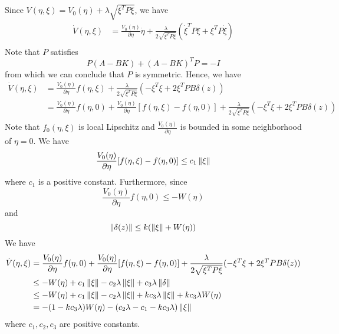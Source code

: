 \documentclass[a4 paper, 12pt]{article}
\begin{document}
Since $V(\eta,\xi) = V_0(\eta) + \lambda\sqrt{\xi^TP\xi}$, we have
\begin{equation}
        \begin{aligned}
                \dot{V}(\eta,\xi) &= \frac{V_0(\eta)}{\partial{\eta}}\dot\eta + \frac{\lambda}{2\sqrt{\xi^TP\xi}}(\dot\xi^TP\xi + \xi^TP\dot\xi) \\
        \end{aligned}
\end{equation}
Note that $P$ satisfies 
\begin{equation}
        P(A-BK) + (A-BK)^TP = -I
\end{equation}
from which we can conclude that $P$ is symmetric. 
Hence, we have 
\begin{equation}
        \begin{aligned}
                \dot{V}(\eta,\xi) &= \frac{V_0(\eta)}{\partial{\eta}}f(\eta,\xi) +  \frac{\lambda}{2\sqrt{\xi^TP\xi}}(-\xi^T\xi + 2\xi^TPB\delta(z)) \\
                &= \frac{V_0(\eta)}{\partial{\eta}}f(\eta,0) + \frac{V_0(\eta)}{\partial{\eta}}[f(\eta,\xi) - f(\eta,0)] +  \frac{\lambda}{2\sqrt{\xi^TP\xi}}(-\xi^T\xi + 2\xi^TPB\delta(z)) \\
        \end{aligned}
\end{equation}
Note that $f_0(\eta,\xi)$ is local Lipschitz and $\frac{V_0(\eta)}{\partial{\eta}}$ is bounded in some neighborhood of $\eta=0$. We have 
\begin{equation}
        \frac{V_0(\eta)}{\partial{\eta}}[f(\eta,\xi) - f(\eta,0)] \leq c_1\left\|\xi\right\|
\end{equation}
where $c_1$ is a positive constant.
Furthermore, since 
\begin{equation}
        \frac{V_0(\eta)}{\partial{\eta}}f(\eta,0) \leq -W(\eta)
\end{equation}
and 
\begin{equation}
       \left\|\delta(z)\right\| \leq k(\left\|\xi\right\| + W(\eta)) 
\end{equation}
We have
\begin{equation}
        \begin{aligned}
                \dot{V}(\eta,\xi) &= \frac{V_0(\eta)}{\partial{\eta}}f(\eta,0) + \frac{V_0(\eta)}{\partial{\eta}}[f(\eta,\xi) - f(\eta,0)] +  \frac{\lambda}{2\sqrt{\xi^TP\xi}}(-\xi^T\xi + 2\xi^TPB\delta(z)) \\
                &\leq -W(\eta) + c_1\left\|\xi\right\| -c_2\lambda\left\|\xi\right\| + c_3\lambda\left\|\delta\right\|  \\ 
                &\leq -W(\eta) + c_1\left\|\xi\right\| -c_2\lambda\left\|\xi\right\| + kc_3\lambda\left\|\xi\right\| + kc_3\lambda W(\eta) \\
                &= -(1-kc_3\lambda)W(\eta) - (c_2\lambda - c_1 - kc_3\lambda)\left\|\xi\right\|
        \end{aligned}
\end{equation}
where $c_1, c_2, c_3$ are positive constants.
\end{document}

